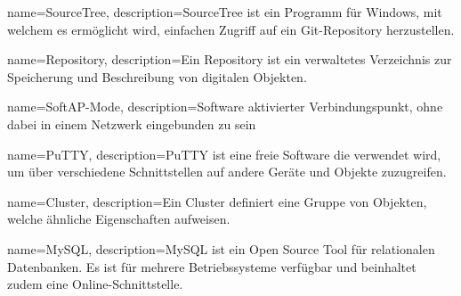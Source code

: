 {
  name=SourceTree,
  description={SourceTree ist ein Programm für Windows, mit welchem es ermöglicht wird, einfachen Zugriff auf ein Git-Repository herzustellen. \cite{sourceTree}}
}

{
  name=Repository,
  description={Ein Repository ist ein verwaltetes Verzeichnis zur Speicherung und Beschreibung von digitalen Objekten.  \cite{rep}}
}

{
  name=SoftAP-Mode,
  description={Software aktivierter Verbindungspunkt, ohne dabei in einem Netzwerk eingebunden zu sein}
}

{
  name=PuTTY,
  description={PuTTY ist eine freie Software die verwendet wird, um über verschiedene Schnittstellen auf andere Geräte und Objekte zuzugreifen.  \cite{putt}}
}

{
  name=Cluster,
  description={Ein Cluster definiert eine Gruppe von Objekten, welche ähnliche Eigenschaften aufweisen.  \cite{cluster}}
}

{
  name=MySQL,
  description={MySQL ist ein Open Source Tool für relationalen Datenbanken. Es ist für mehrere Betriebssysteme verfügbar und beinhaltet zudem eine Online-Schnittstelle. \cite{mySQL}}
}


\glsaddall

\printglossary[style=super, nonumberlist]

